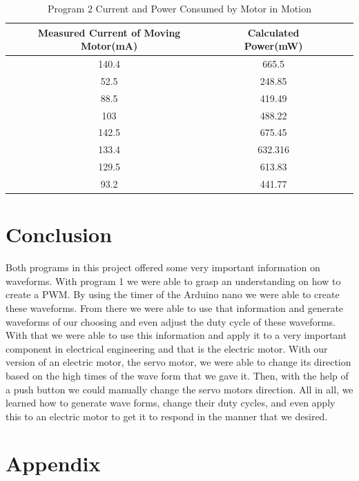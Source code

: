 \documentclass[11pt,pdftex,portrait,letterpaper]{article}
\begin{document}
	\begin{table}[htb]
		\centering
		\begin{tabular}{ | c | c | c | c | }	%
			\hline
			\textbf{Measured Current of Moving Motor(mA)} & \textbf{Calculated Power(mW)}  \\ \hline \hline
			 140.4 & 665.5  \\ \hline
			52.5 & 248.85 \\ \hline
			88.5 & 419.49 \\ \hline
			103 & 488.22 \\ \hline
			142.5 & 675.45 \\ \hline	
			133.4 & 632.316 \\ \hline
			129.5 & 613.83 \\ \hline		
			93.2 & 441.77 \\ \hline				
		\end{tabular}
		\caption{Program 2 Current and Power Consumed by Motor in Motion }
		\label{t:table1}	%
	\end{table}

\pagebreak
	

	
	\section{Conclusion}
	

	
	Both programs in this project offered some very important information on waveforms. With program 1 we were able to grasp an understanding on how to create a PWM. By using the timer of the Arduino nano we were able to create these waveforms. From there we were able to use that information and generate waveforms of our choosing and even adjust the duty cycle of these waveforms. With that we were able to use this information and apply it to a very important component in electrical engineering and that is the electric motor. With our version of an electric motor, the servo motor, we were able to change its direction based on the high times of the wave form that we gave it. Then, with the help of a push button we could manually change the servo motors direction. All in all, we learned how to generate wave forms, change their duty cycles, and even apply this to an electric motor to get it to respond in the manner that we desired.
	
	

	
	\section{Appendix}
	
\end{document}

